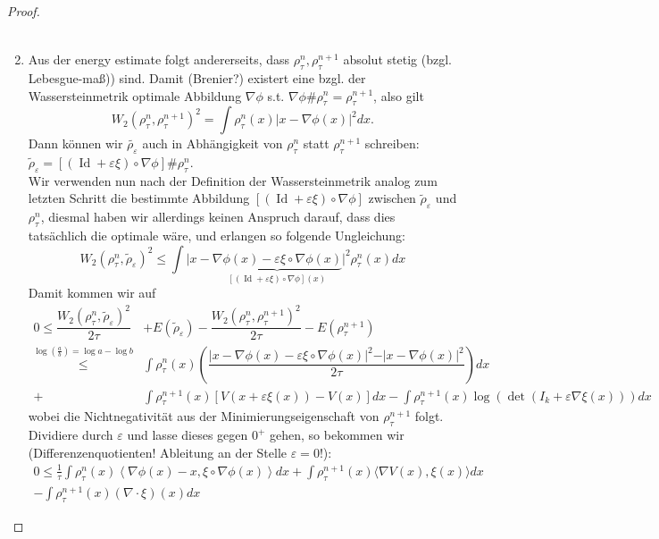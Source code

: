 \documentclass[11pt,a4paper,notitlepage]{scrreprt}
\begin{document}
\begin{proof}
\begin{enumerate}
\begin{eqnarray}
\end{eqnarray}
\item Aus der energy estimate folgt andererseits, dass $\rho_\tau^n, \rho_\tau^{n+1}$ absolut stetig (bzgl. Lebesgue-maß)) sind. Damit (Brenier?) existert eine bzgl. der Wassersteinmetrik optimale Abbildung $\nabla \phi$ s.t. $\nabla \phi \# \rho_\tau^n=\rho_\tau^{n+1}$, also gilt
\begin{equation}
W_2(\rho_\tau^n,\rho_\tau^{n+1})^2=\int \rho_\tau^n(x)\vert x-\nabla\phi(x)\vert^2 dx.
\end{equation}
Dann können wir $\tilde{\rho_\varepsilon}$ auch in Abhängigkeit von $\rho_\tau^n$ statt $\rho_\tau^{n+1}$ schreiben: $\tilde{\rho}_\varepsilon=[(\operatorname{Id}+\varepsilon\xi)\circ\nabla\phi]\#\rho_\tau^n$.\\
Wir verwenden nun nach der Definition der Wassersteinmetrik analog zum letzten Schritt die bestimmte Abbildung $[(\operatorname{Id}+\varepsilon\xi)\circ\nabla\phi]$ zwischen $\tilde{\rho}_\varepsilon$ und $\rho_\tau^n$, diesmal haben wir allerdings keinen Anspruch darauf, dass dies tatsächlich die optimale wäre, und erlangen so folgende Ungleichung:
\begin{equation*}
W_2(\rho_\tau^n,\tilde{\rho}_\varepsilon)^2 \leq \int \vert x-\underset{[(\operatorname{Id}+\varepsilon\xi)\circ\nabla\phi](x)}{\underbrace{\nabla \phi(x)-\varepsilon\xi\circ\nabla\phi(x)}}\vert^2 \rho_\tau^n(x)dx
\end{equation*}
Damit kommen wir auf
\begin{align}
0\leq\dfrac{W_2(\rho_\tau^n,\tilde{\rho}_\varepsilon)^2}{2\tau}&+E(\tilde{\rho}_\varepsilon)-\dfrac{W_2(\rho_\tau^n,\rho_\tau^{n+1})^2}{2\tau}-E(\rho_\tau^{n+1})\\
\overset{\log(\frac{a}{b})=\log a-\log b}\leq&\int\rho_\tau^n(x)\left(\dfrac{\vert x-\nabla \phi(x)-\varepsilon\xi\circ\nabla\phi(x)\vert^2-\vert x-\nabla\phi(x)\vert^2}{2\tau}\right)dx\\
+&\int\rho_\tau^{n+1}(x)[V(x+\varepsilon\xi(x))-V(x)]dx-\int\rho_\tau^{n+1}(x)\log( \det(I_k+\varepsilon\nabla\xi(x)))dx
\end{align}
wobei die Nichtnegativität aus der Minimierungseigenschaft von $\rho_\tau^{n+1}$ folgt.\\
Dividiere durch $\varepsilon$ und lasse dieses gegen $0^+$ gehen, so bekommen wir (Differenzenquotienten! Ableitung an der Stelle $\varepsilon=0$!): 
\begin{align*}
0\leq\frac{1}{\tau} \int \rho_\tau^n(x)\left\langle\nabla\phi(x)-x,\xi\circ\nabla\phi(x)\right\rangle dx+\int\rho_\tau^{n+1}(x)\langle\nabla V(x),\xi(x)\rangle dx\\-\int\rho_\tau^{n+1}(x)(\nabla\cdot \xi)(x)dx

\end{align*}
\end{enumerate}
\end{proof}
\end{document}
